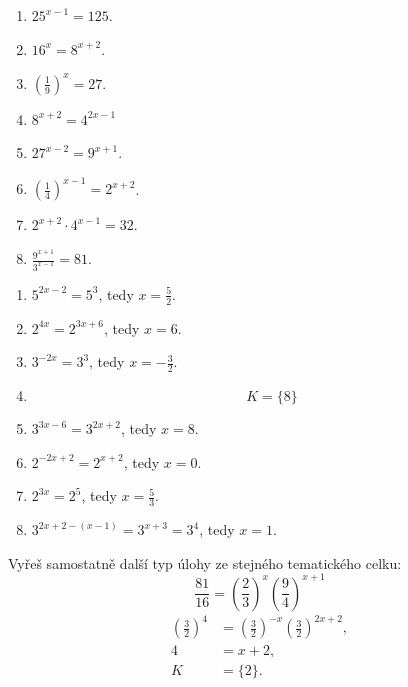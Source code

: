 \documentclass[11pt,a4paper]{article}
\begin{document}
\begin{zadaniReseniBox}[title={Samostatná práce 1}]
\begin{enumerate}[label=\alph*)]
\item $25^{x-1}=125$.
\item $16^x=8^{x+2}$.
\item $\left(\frac{1}{9}\right)^x=27$.
\item $8^{x+2}=4^{2x-1}$
\item $27^{x-2}=9^{x+1}$.
\item $\left(\frac{1}{4}\right)^{x-1}=2^{x+2}$.
\item $2^{x+2}\cdot4^{x-1}=32$.
\item $\frac{9^{x+1}}{3^{x-1}}=81$.
\end{enumerate}
\tcblower
\begin{enumerate}[label=\alph*)]
\item $5^{2x-2}=5^3$, tedy $x=\frac{5}{2}$.
\item $2^{4x}=2^{3x+6}$, tedy $x=6$.
\item $3^{-2x}=3^3$, tedy $x=-\frac{3}{2}$.
\item \[K=\{8\}\]
\item $3^{3x-6}=3^{2x+2}$, tedy $x=8$.
\item $2^{-2x+2}=2^{x+2}$, tedy $x=0$.
\item $2^{3x}=2^5$, tedy $x=\frac{5}{3}$.
\item $3^{2x+2-(x-1)}=3^{x+3}=3^4$, tedy $x=1$.
\end{enumerate}
\end{zadaniReseniBox}
\begin{zadaniReseniBox}[title={Samostatná práce 2}]
Vyřeš samostatně další typ úlohy ze stejného tematického celku:
\[
\displaystyle\frac{81}{16}=\left(\frac{2}{3}\right)^x\left(\frac{9}{4}\right)^{x+1}
\]
\tcblower
\[\begin{aligned}\left(\frac{3}{2}\right)^4&=\left(\frac{3}{2}\right)^{-x}\left(\frac{3}{2}\right)^{2x+2},\\4&=x+2,\\K&=\{2\}.\end{aligned}\]
\end{zadaniReseniBox}
\end{document}
